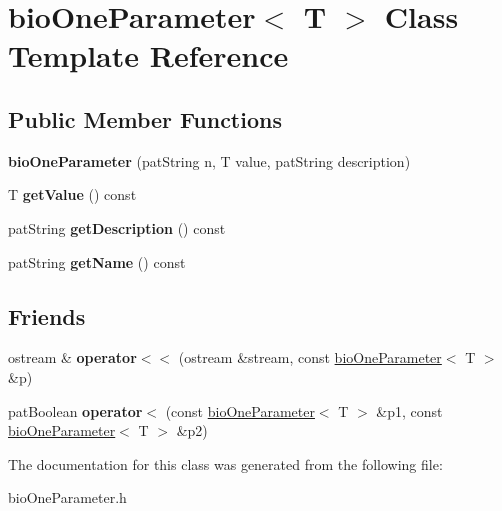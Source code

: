 \hypertarget{classbio_one_parameter}{}\section{bio\+One\+Parameter$<$ T $>$ Class Template Reference}
\label{classbio_one_parameter}
\subsection*{Public Member Functions}
\begin{DoxyCompactItemize}
\item 
\mbox{\label{classbio_one_parameter_a92959e76ad1c2c078ceec11978cec143}} 
{\bfseries bio\+One\+Parameter} (pat\+String n, T value, pat\+String description)
\item 
\mbox{\label{classbio_one_parameter_abb20776a01cc7c078a8ac12936ecfec6}} 
T {\bfseries get\+Value} () const
\item 
\mbox{\label{classbio_one_parameter_a5260f81480724e98bd27709746c0985f}} 
pat\+String {\bfseries get\+Description} () const
\item 
\mbox{\label{classbio_one_parameter_ade66fc37f83338f676ed2e2f1ea6abb0}} 
pat\+String {\bfseries get\+Name} () const
\end{DoxyCompactItemize}
\subsection*{Friends}
\begin{DoxyCompactItemize}
\item 
\mbox{\label{classbio_one_parameter_aebc903a34262948e8e8623e22c5ce66f}} 
ostream \& {\bfseries operator$<$$<$} (ostream \&stream, const \hyperlink{classbio_one_parameter}{bio\+One\+Parameter}$<$ T $>$ \&p)
\item 
\mbox{\label{classbio_one_parameter_a67418a8fe441e1da36f7189f43ead863}} 
pat\+Boolean {\bfseries operator$<$} (const \hyperlink{classbio_one_parameter}{bio\+One\+Parameter}$<$ T $>$ \&p1, const \hyperlink{classbio_one_parameter}{bio\+One\+Parameter}$<$ T $>$ \&p2)
\end{DoxyCompactItemize}


The documentation for this class was generated from the following file\+:\begin{DoxyCompactItemize}
\item 
bio\+One\+Parameter.\+h\end{DoxyCompactItemize}
